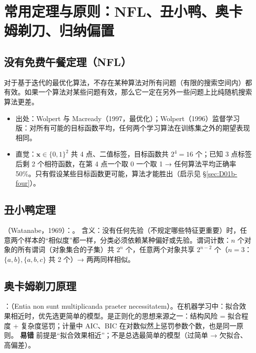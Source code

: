 \section{常用定理与原则：NFL、丑小鸭、奥卡姆剃刀、归纳偏置}

\subsection{没有免费午餐定理（NFL）}
\begin{thm}
对于基于迭代的最优化算法，不存在某种算法对所有问题（有限的搜索空间内）都有效。如果一个算法对某些问题有效，那么它一定在另外一些问题上比纯随机搜索算法更差。
\end{thm}
\begin{itemize}
\item 出处：Wolpert 与 Macready（1997，最优化）；Wolpert（1996）监督学习版：对所有可能的目标函数平均，任何两个学习算法在训练集之外的期望表现相同。
\item 直觉：$\bm x\in\{0,1\}^2$ 共 4 点、二值标签，目标函数共 $2^4=16$ 个；已知 3 点标签后剩 2 个相符函数，在第 4 点一个取 0 一个取 1 → 任何算法平均正确率 50\%。只有假设某些目标函数更可能，算法才能胜出（启示见 \S\ref{sec:D01b-four}）。
\end{itemize}

\subsection{丑小鸭定理}
（Watanabe，1969）：。
含义：没有任何先验（不规定哪些特征更重要）时，任意两个样本的“相似度”都一样，分类必须依赖某种偏好或先验。谓词计数：$n$ 个对象的所有谓词（对象集合的子集）共 $2^n$ 个，任意两个对象共享 $2^{n-2}$ 个（$n=3$：$\{a,b\},\{a,b,c\}$ 共 2 个）→ 两两同样相似。

\subsection{奥卡姆剃刀原理}
：（Entia non sunt multiplicanda praeter necessitatem）。在机器学习中：拟合效果相近时，优先选更简单的模型。是正则化的思想来源之一：结构风险 = 拟合程度 + 复杂度惩罚；计量中 AIC、BIC 在对数似然上惩罚参数个数，也是同一原则。
\textbf{易错} 前提是“拟合效果相近”；不是总选最简单的模型（过简单 → 欠拟合、高偏差）。

